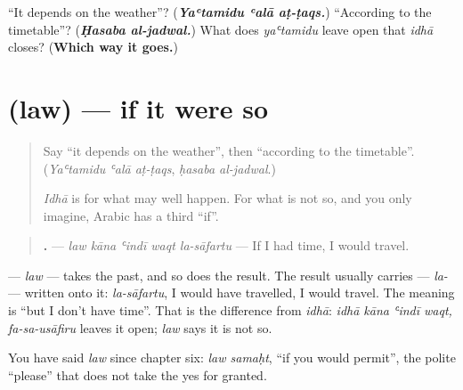 \begin{tcolorbox}[breakable,colback=teal!4,colframe=teal!35!black,title={Before you move on}]
\textquotedblleft{}It depends on the weather\textquotedblright{}? (\emph{\textbf{Yaʿtamidu ʿalā aṭ-ṭaqs.}}) \textquotedblleft{}According to the timetable\textquotedblright{}? (\emph{\textbf{Ḥasaba al-jadwal.}}) What does \emph{yaʿtamidu} leave open that \emph{idhā} closes? (\textbf{Which way it goes.})
\end{tcolorbox}
\section[\texorpdfstring{\ar{لو} \ar{كان} \ar{عندي} \ar{وقت} … (law kāna ʿindī …)}{لو كان عندي وقت … (law kāna ʿindī …)}]{ (law) — if it were so}

\label{lesson:AR-C292-law}



\begin{quote}
Say \textquotedblleft{}it depends on the weather\textquotedblright{}, then \textquotedblleft{}according to the timetable\textquotedblright{}. (\emph{Yaʿtamidu ʿalā aṭ-ṭaqs}, \emph{ḥasaba al-jadwal}.)

\emph{Idhā} is for what may well happen. For what is not so, and you only imagine, Arabic has a third \textquotedblleft{}if\textquotedblright{}.
\end{quote}

\begin{grammarlens}[title={Grammar Lens: law, and la- on the result}]
\begin{quote}
\textbf{    .} — \emph{law kāna ʿindī waqt la-sāfartu} — If I had time, I would travel.
\end{quote}

\textbf{} — \emph{law} — takes the past, and so does the result. The result usually carries \textbf{} — \emph{la-} — written onto it: \emph{la-sāfartu}, I would have travelled, I would travel. The meaning is \textquotedblleft{}but I don't have time\textquotedblright{}. That is the difference from \emph{idhā}: \emph{idhā kāna ʿindī waqt, fa-sa-usāfiru} leaves it open; \emph{law} says it is not so.

You have said \emph{law} since chapter six: \emph{law samaḥt}, \textquotedblleft{}if you would permit\textquotedblright{}, the polite \textquotedblleft{}please\textquotedblright{} that does not take the yes for granted.
\end{grammarlens}


